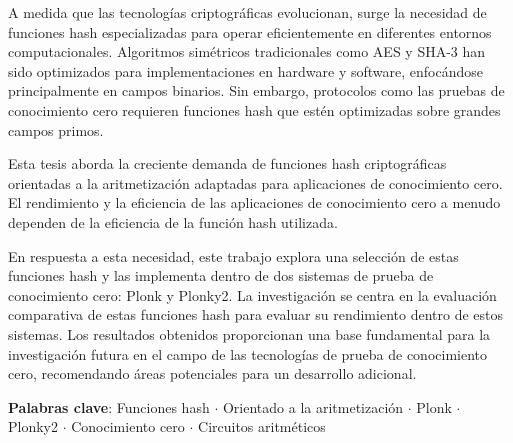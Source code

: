 \documentclass[draft,final]{vutinfth} %
\begin{document}
\begin{resumen*}
A medida que las tecnologías criptográficas evolucionan, surge la necesidad de funciones hash especializadas para operar eficientemente en diferentes entornos computacionales. Algoritmos simétricos tradicionales como AES y SHA-3 han sido optimizados para implementaciones en hardware y software, enfocándose principalmente en campos binarios. Sin embargo, protocolos como las pruebas de conocimiento cero requieren funciones hash que estén optimizadas sobre grandes campos primos.

Esta tesis aborda la creciente demanda de funciones hash criptográficas orientadas a la aritmetización adaptadas para aplicaciones de conocimiento cero. El rendimiento y la eficiencia de las aplicaciones de conocimiento cero a menudo dependen de la eficiencia de la función hash utilizada.
    
En respuesta a esta necesidad, este trabajo explora una selección de estas funciones hash y las implementa dentro de dos sistemas de prueba de conocimiento cero: Plonk y Plonky2. La investigación se centra en la evaluación comparativa de estas funciones hash para evaluar su rendimiento dentro de estos sistemas. Los resultados obtenidos proporcionan una base fundamental para la investigación futura en el campo de las tecnologías de prueba de conocimiento cero, recomendando áreas potenciales para un desarrollo adicional.

\textbf{Palabras clave}: Funciones hash $\cdot$ Orientado a la aritmetización $\cdot$ Plonk $\cdot$ Plonky2 $\cdot$ Conocimiento cero $\cdot$ Circuitos aritméticos
\end{resumen*}
\end{document}
